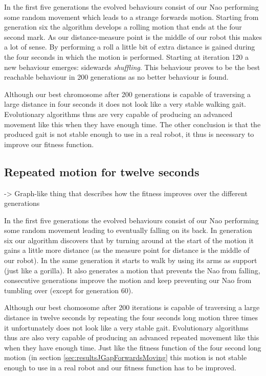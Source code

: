 \documentclass[a4paper,10pt]{article}
\begin{document}
In the first five generations the evolved behaviours consist of our Nao performing some random movement which leads to a strange forwards motion. Starting from generation six the algorithm develops a rolling motion that ends at the four second mark. As our distance-measure point is the middle of our robot this makes a lot of sense. By performing a roll a little bit of extra distance is gained during the four seconds in which the motion is performed. Starting at iteration 120 a new behaviour emerges: sidewards \emph{shuffling}. This behaviour proves to be the best reachable behaviour in 200 generations as no better behaviour is found. 

Although our best chromosome after 200 generations is capable of traversing a large distance in four seconds it does not look like a very stable walking gait. Evolutionary algorithms thus are very capable of producing an advanced movement like this when they have enough time. The other conclusion is that the produced gait is not stable enough to use in a real robot, it thus is necessary to improve our fitness function. 

\subsection{Repeated motion for twelve seconds}
\label{sec:resultsJGapForwardsMovingTwelveSeconds}
-> Graph-like thing that describes how the fitness improves over the different generations

In the first five generations the evolved behaviours consist of our Nao performing some random movement leading to eventually falling on its back. In generation six our algorithm discovers that by turning around at the start of the motion it gains a little more distance (as the measure point for distance is the middle of our robot). In the same generation it starts to walk by using its arms as support (just like a gorilla). It also generates a motion that prevents the Nao from falling, consecutive generations improve the motion and keep preventing our Nao from tumbling over (except for generation 60).

Although our best chomosome after 200 iterations is capable of traversing a large distance in twelve seconds by repeating the four seconds long motion three times it unfortunately does not look like a very stable gait. Evolutionary algorithms thus are also very capable of producing an advanced repeated movement like this when they have enough time. Just like the fitness function of the four second long motion (in section \ref{sec:resultsJGapForwardsMoving} this motion is not stable enough to use in a real robot and our fitness function has to be improved. 
\end{document}

